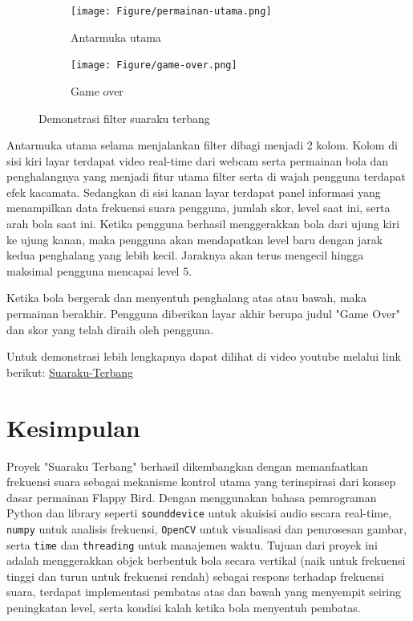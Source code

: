\documentclass[11pt,a4paper]{article}
\begin{document}
\begin{figure}[h!]
	\centering
	\begin{subfigure}{0.4\textwidth}
		\centering
		\def\svgwidth{\columnwidth}
		\texttt{[image: Figure/permainan-utama.png]}
		\caption{Antarmuka utama}
		\label{fig:aug-1}
	\end{subfigure}
	\qquad %
	\begin{subfigure}[b]{0.4\textwidth}
		\centering
		\def\svgwidth{\columnwidth}
		\texttt{[image: Figure/game-over.png]}
		\caption{Game over}
		\label{fig:aug-2}
	\end{subfigure}
	\caption{Demonstrasi filter suaraku terbang}\label{fig:aug}
\end{figure}
Antarmuka utama selama menjalankan filter dibagi menjadi 2 kolom. Kolom di sisi kiri layar terdapat video real-time dari webcam serta permainan bola dan penghalangnya yang menjadi fitur utama filter serta di wajah pengguna terdapat efek kacamata. Sedangkan di sisi kanan layar terdapat panel informasi yang menampilkan data frekuensi suara pengguna, jumlah skor, level saat ini, serta arah bola saat ini. Ketika pengguna berhasil menggerakkan bola dari ujung kiri ke ujung kanan, maka pengguna akan mendapatkan level baru dengan jarak kedua penghalang yang lebih kecil. Jaraknya akan terus mengecil hingga maksimal pengguna mencapai level 5.

Ketika bola bergerak dan menyentuh penghalang atas atau bawah, maka permainan berakhir. Pengguna diberikan layar akhir berupa judul "Game Over" dan skor yang telah diraih oleh pengguna.

Untuk demonstrasi lebih lengkapnya dapat dilihat di video youtube melalui link berikut: \href{https://youtu.be/gLfBfn93XxQ?si=rfyxxNq5SirJSzCE}{Suaraku-Terbang}

\section{Kesimpulan}
Proyek "Suaraku Terbang" berhasil dikembangkan dengan memanfaatkan frekuensi suara sebagai mekanisme kontrol utama yang terinspirasi dari konsep dasar permainan Flappy Bird. Dengan menggunakan bahasa pemrograman Python dan library seperti \texttt{sounddevice} untuk akuisisi audio secara real-time, \texttt{numpy} untuk analisis frekuensi, \texttt{OpenCV} untuk visualisasi dan pemrosesan gambar, serta \texttt{time} dan \texttt{threading} untuk manajemen waktu. Tujuan dari proyek ini adalah menggerakkan objek berbentuk bola secara vertikal (naik untuk frekuensi tinggi dan turun untuk frekuensi rendah) sebagai respons terhadap frekuensi suara, terdapat implementasi pembatas atas dan bawah yang menyempit seiring peningkatan level, serta kondisi kalah ketika bola menyentuh pembatas.
\end{document}
